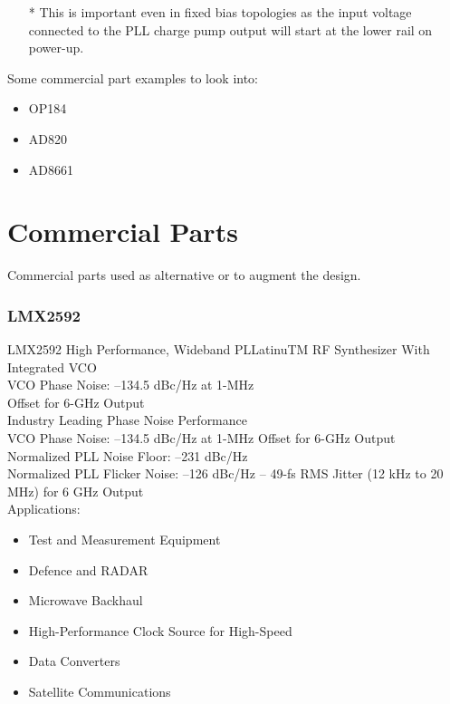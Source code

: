 \documentclass{article}
\begin{document}
\begin{itemize}
	\item [*] This is important even in fixed bias topologies as the input voltage connected to the PLL charge pump output will start at the lower rail on power-up.
\end{itemize}

Some commercial part examples to look into:
\begin{itemize}
	\item OP184
	\item AD820
	\item AD8661 
\end{itemize}


\section{Commercial Parts}

Commercial parts used as alternative or to augment the design.

\subsubsection*{LMX2592}
LMX2592 High Performance, Wideband PLLatinuTM RF Synthesizer With Integrated VCO
\\
VCO Phase Noise: –134.5 dBc/Hz at 1-MHz
\\
Offset for 6-GHz Output
\\
Industry Leading Phase Noise Performance 
\\
VCO Phase Noise: –134.5 dBc/Hz at 1-MHz Offset for 6-GHz Output
\\
Normalized PLL Noise Floor: –231 dBc/Hz 
\\
Normalized PLL Flicker Noise: –126 dBc/Hz – 49-\unit[]{\fs} RMS Jitter (12 kHz to 20 MHz) for 6 GHz Output
\\
Applications: 
\begin{itemize}
	\item Test and Measurement Equipment
	\item Defence and RADAR
	\item Microwave Backhaul
	\item High-Performance Clock Source for High-Speed
	\item Data Converters
	\item Satellite Communications
\end{itemize}
\end{document}

